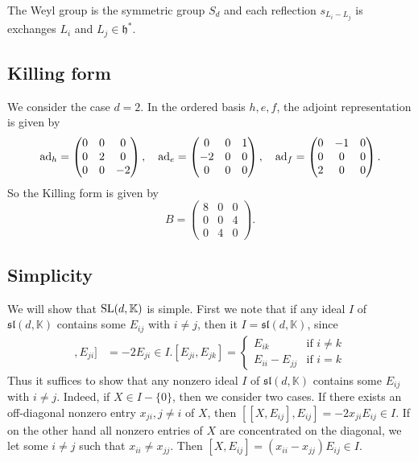 \documentclass{report}
\begin{document}
The Weyl group is the symmetric group $S_d$ and each reflection $s_{L_i - L_j}$ is exchanges $L_i$ and $L_j \in \mathfrak h^*$.
\subsection{Killing form}
We consider the case $d = 2$.
In the ordered basis $h,e,f$, the adjoint representation is given by
\[
\operatorname{ad}_h = \begin{pmatrix} 0 & 0 & 0 \\ 0 & 2 & 0 \\ 0 & 0 & -2 \end{pmatrix}, \quad
\operatorname{ad}_e = \begin{pmatrix} 0 & 0 & 1 \\ -2 & 0 & 0 \\ 0 & 0 & 0 \end{pmatrix}, \quad
\operatorname{ad}_f = \begin{pmatrix} 0 & -1 & 0 \\ 0 & 0 & 0 \\ 2 & 0 & 0 \end{pmatrix}.
\]
So the Killing form is given by
\[
B = \begin{pmatrix} 8 & 0 & 0 \\ 0 & 0 & 4 \\ 0 & 4 & 0 \end{pmatrix}.
\]

\subsection{Simplicity}
We will show that $\operatorname{{\mathrm{SL}}}(d, \mathbb K)$ is simple.
First we note that if any ideal $I$ of $\mathfrak{sl}(d, \mathbb K)$ contains some $E_{ij}$ with $i \neq j$, then it $I = \mathfrak{sl}(d, \mathbb K)$, since
\begin{align*}
    [[E_{ij}, E_{ji}], E_{ji}] &= -2 E_{ji} \in I.
    [E_{ji}, E_{jk}] = \begin{cases}
        E_{ik} & \text{if } i \neq k\\
        E_{ii} - E_{jj} & \text{if } i = k
    \end{cases}
\end{align*}
Thus it suffices to show that any nonzero ideal $I$ of $\mathfrak{sl}(d, \mathbb K)$ contains some $E_{ij}$ with $i \neq j$.
Indeed, if $X \in I - \{0 \}$, then we consider two cases.
If there exists an off-diagonal nonzero entry $x_{ji}, j\neq i$ of $X$, then $[[X, E_{ij}], E_{ij}] = -2x_{ji}E_{ij} \in I$.
If on the other hand all nonzero entries of $X$ are concentrated on the diagonal, we let some $i \neq j$ such that $x_{ii} \neq x_{jj}$.
Then $[X, E_{ij}] = (x_{ii} - x_{jj})E_{ij} \in I$. 
\end{document}
